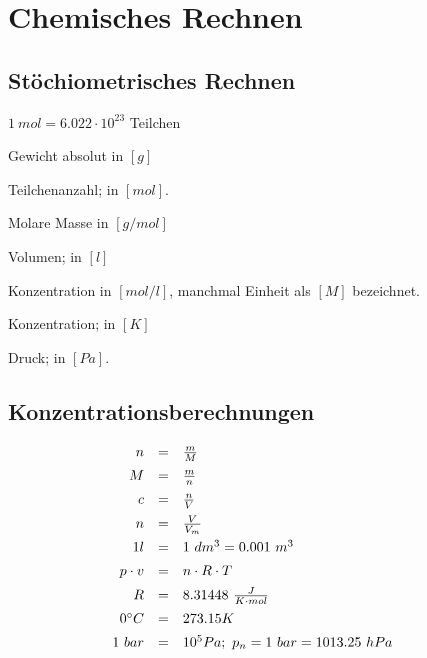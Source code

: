\section{Chemisches Rechnen}

\subsection{Stöchiometrisches Rechnen}

\begin{definition}[mol]
	$1 \ mol = 6.022 \cdot 10^{23}$ Teilchen
\end{definition}

\begin{definition}[m]
	Gewicht absolut in $[g]$
\end{definition}

\begin{definition}[n]
	Teilchenanzahl; in $[mol]$.
\end{definition}

\begin{definition}[M]
	Molare Masse in $[g/mol]$
\end{definition}

\begin{definition}[V]
	Volumen; in	$[l]$
\end{definition}

\begin{definition}[c]
	Konzentration in $[mol/l]$, manchmal Einheit als $[M]$ bezeichnet.
\end{definition}

\begin{definition}[T]
	Konzentration; in $[K]$
\end{definition}

\begin{definition}[p]
	Druck; in $[Pa]$.
\end{definition}


\subsection{Konzentrationsberechnungen}

{\large
	
$$
\begin{array}{rcll}
n                & = & \frac{m}{M}           &\\[0.5em]
M                & = & \frac{m}{n}    &\\[0.5em]
c                 & = & \frac{n}{V} &\\[0.5em]
n                 & = &\frac{V}{V_m}             &\\[0.5em]
1l                & = & 1\ dm^3=0.001\ m^3         &\\[0.5em]
p \cdot v    & = & n \cdot R \cdot T                       &\\[0.5em]
R                & = & 8.31448 \ \frac{J}{K \cdot mol}                       &\\[0.5em]
0\degree C & = & 273.15K             &\\[0.5em]
1\ bar         & = & 10^5 Pa; \ p_{n} = 1\ bar = 1013.25\ hPa & 
\end{array}
$$

}
